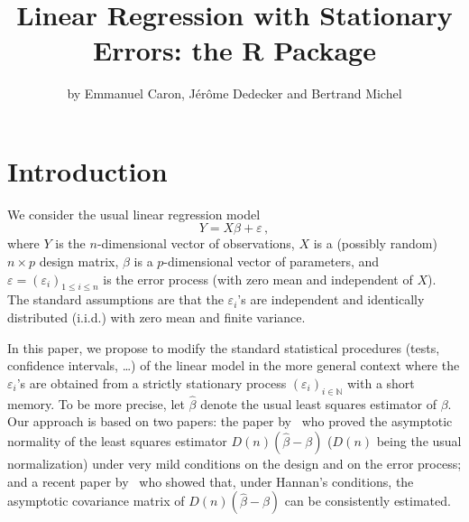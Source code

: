 \title{Linear Regression with Stationary Errors: the R Package }
\author{by Emmanuel Caron, Jérôme Dedecker and Bertrand Michel}

\maketitle


\section{Introduction}

We consider the usual linear regression model
$$
Y = X \beta + \varepsilon \, ,
$$
where $Y$ is the $n$-dimensional vector of observations, $X$ is a (possibly random) $n \times  p$ design matrix, $\beta$ is a $p$-dimensional vector of parameters, and $\varepsilon= (\varepsilon_i)_{1 \leq i \leq n}$ is the error process (with zero mean and independent of $X$). The standard assumptions are that the $\varepsilon_i$'s are independent and identically distributed (i.i.d.) with zero mean and finite variance.

In this paper, we propose to modify the standard statistical procedures (tests, confidence intervals, \ldots) of the linear model in the more general context where the $\varepsilon_i$'s are obtained from a strictly stationary process $(\varepsilon_i)_{i \in {\mathbb N}}$ with a short memory. To be more precise, let  $\hat \beta$ denote the usual least squares estimator of $\beta$. Our approach is based on two papers: the paper by~\cite{hannan1973central} who proved the asymptotic normality of the least squares estimator $D(n)(\hat \beta - \beta)$ ($D(n)$ being the usual normalization) under very mild conditions on the design and on the error process; and a recent paper by~\cite{caron2019} who
showed that, under Hannan's conditions, the asymptotic covariance matrix of $D(n)(\hat \beta - \beta)$ can be consistently estimated.

